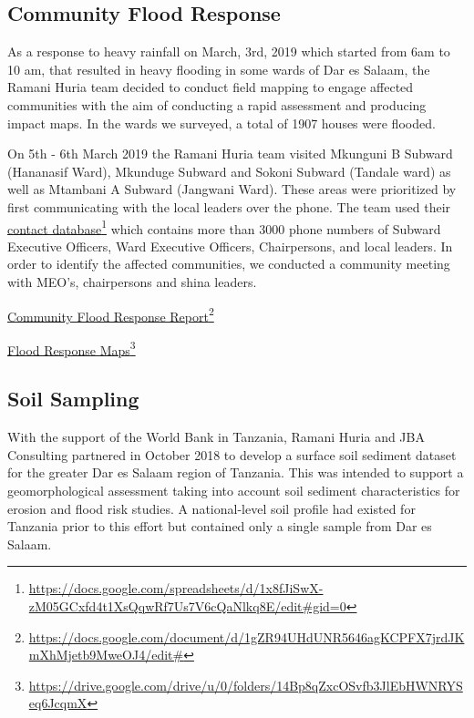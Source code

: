 \documentclass[a4paper,12pt,twoside]{article}
\begin{document}
\begin{multicols}{2}
\subsection{Community Flood Response}
As a response to heavy rainfall on March, 3rd, 2019 which started from 6am to 10 am, that resulted in heavy flooding in some wards of Dar es Salaam, the Ramani Huria team decided to conduct field mapping to engage affected communities with the aim of conducting a rapid assessment and producing impact maps. In the wards we surveyed, a total of 1907 houses were flooded.

On 5th - 6th March 2019 the Ramani Huria team visited Mkunguni B Subward (Hananasif Ward), Mkunduge Subward and Sokoni Subward (Tandale ward) as well as Mtambani A Subward (Jangwani Ward). These areas were prioritized by first communicating with the local leaders over the phone. The team used their \href{https://docs.google.com/spreadsheets/d/1x8fJiSwX-zM05GCxfd4t1XsQqwRf7Us7V6cQaNlkq8E/edit#gid=0}{contact database}\footnote{\url{https://docs.google.com/spreadsheets/d/1x8fJiSwX-zM05GCxfd4t1XsQqwRf7Us7V6cQaNlkq8E/edit#gid=0}} which contains more than 3000 phone numbers of Subward Executive Officers, Ward Executive Officers, Chairpersons, and local leaders. In order to identify the affected communities, we conducted a community meeting with MEO’s, chairpersons and shina leaders.

\medskip
\href{https://docs.google.com/document/d/1gZR94UHdUNR5646agKCPFX7jrdJKmXhMjetb9MweOJ4/edit#}{Community Flood Response Report}\footnote{\url{https://docs.google.com/document/d/1gZR94UHdUNR5646agKCPFX7jrdJKmXhMjetb9MweOJ4/edit#}}

\medskip
\href{https://drive.google.com/drive/u/0/folders/14Bp8qZxcOSvfb3JlEbHWNRYSeq6JcqmX}{Flood Response Maps}\footnote{\url{https://drive.google.com/drive/u/0/folders/14Bp8qZxcOSvfb3JlEbHWNRYSeq6JcqmX}}
\subsection{Soil Sampling}
With the support of the World Bank in Tanzania, Ramani Huria and JBA Consulting partnered in October 2018 to develop a surface soil sediment dataset for the greater Dar es Salaam region of Tanzania. This was intended to support a geomorphological assessment taking into account soil sediment characteristics for erosion and flood risk studies.
A national-level soil profile had existed for Tanzania prior to this effort but contained only a single sample from Dar es Salaam. 


\end{multicols}
\end{document}
